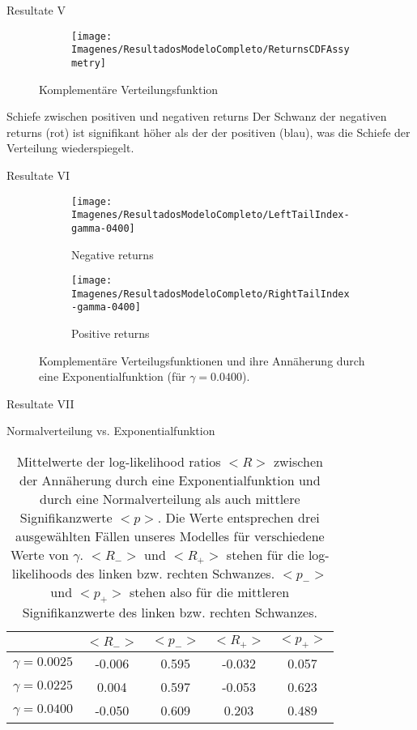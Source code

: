 \documentclass{beamer}
\begin{document}
	\begin{frame}{Resultate V}
		\begin{figure}[!h]
			\centering
			\begin{subfigure}[b]{0.6\textwidth}
				\texttt{[image: Imagenes/ResultadosModeloCompleto/ReturnsCDFAssymetry]}
			\end{subfigure}
			\caption{Komplementäre Verteilungsfunktion}
		\end{figure}
		\begin{block}{Schiefe zwischen positiven und negativen returns}
			Der Schwanz der negativen returns (rot) ist signifikant höher als der der positiven (blau), was die Schiefe der Verteilung wiederspiegelt.
		\end{block}
	\end{frame}

	\begin{frame}{Resultate VI}
		\begin{figure}[!h]
			\begin{subfigure}[b]{0.45\textwidth}
				\texttt{[image: Imagenes/ResultadosModeloCompleto/LeftTailIndex-gamma-0400]}
				\caption{Negative returns}
			\end{subfigure}
			\hfill
			\begin{subfigure}[b]{0.45\textwidth}
				\texttt{[image: Imagenes/ResultadosModeloCompleto/RightTailIndex-gamma-0400]}
				\caption{Positive returns}
			\end{subfigure}
			\caption{Komplementäre Verteilugsfunktionen und ihre Annäherung durch eine Exponentialfunktion (für $\gamma=0.0400$).}
		\end{figure}
	\end{frame}

	\begin{frame}{Resultate VII}
		\begin{block}{Normalverteilung vs. Exponentialfunktion}
			\begin{table}[!h]
				\centering
				\begin{tabular}{ccccc}
					\hline
					\cline{1-5}
					& $<R_{-}>$  & $<p_{-}>$  & $<R_{+}>$ & $<p_{+}>$\\
					\hline
					$\gamma=0.0025$ & -0.006 & 0.595 & -0.032 & 0.057\\
					$\gamma=0.0225$ & 0.004 & 0.597 & -0.053 & 0.623\\
					$\gamma=0.0400$ & -0.050 & 0.609 & 0.203 & 0.489\\
					\hline
				\end{tabular}
				\caption{Mittelwerte der log-likelihood ratios $<R>$ zwischen der Annäherung durch eine
					Exponentialfunktion und durch eine Normalverteilung als auch mittlere Signifikanzwerte
					$<p>$. Die Werte entsprechen drei ausgewählten Fällen unseres Modelles für verschiedene Werte von $\gamma$.  $<R_{-}>$ und $<R_{+}>$ stehen für die
					log-likelihoods des linken bzw. rechten Schwanzes. $<p_{-}>$ und $<p_{+}>$ stehen also für die mittleren Signifikanzwerte des linken bzw. rechten Schwanzes.}
			\end{table}
		\end{block}
	\end{frame}
\end{document}
